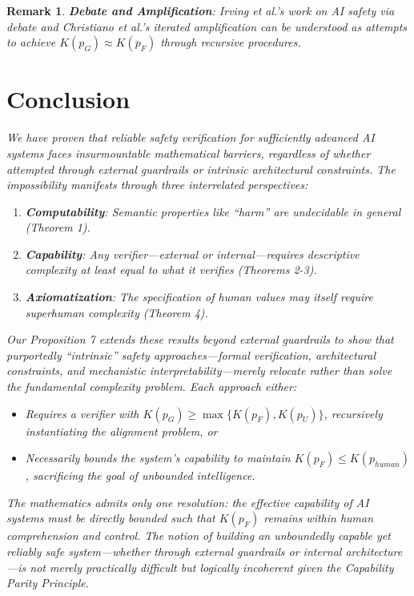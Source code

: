 \documentclass[11pt]{article}
\newtheorem{remark}{Remark}
\begin{document}
\begin{remark}
\textbf{Debate and Amplification}: Irving et al.'s work on AI safety via debate \cite{irving2018debate} and Christiano et al.'s iterated amplification \cite{christiano2018amplification} can be understood as attempts to achieve $K(p_G) \approx K(p_F)$ through recursive procedures.

\section{Conclusion}

We have proven that reliable safety verification for sufficiently advanced AI systems faces insurmountable mathematical barriers, regardless of whether attempted through external guardrails or intrinsic architectural constraints. The impossibility manifests through three interrelated perspectives:

\begin{enumerate}
\item \textbf{Computability}: Semantic properties like ``harm'' are undecidable in general (Theorem 1).
\item \textbf{Capability}: Any verifier—external or internal—requires descriptive complexity at least equal to what it verifies (Theorems 2-3).
\item \textbf{Axiomatization}: The specification of human values may itself require superhuman complexity (Theorem 4).
\end{enumerate}

Our Proposition 7 extends these results beyond external guardrails to show that purportedly ``intrinsic'' safety approaches—formal verification, architectural constraints, and mechanistic interpretability—merely relocate rather than solve the fundamental complexity problem. Each approach either:
\begin{itemize}
\item Requires a verifier with $K(p_G) \geq \max\{K(p_F), K(p_U)\}$, recursively instantiating the alignment problem, or
\item Necessarily bounds the system's capability to maintain $K(p_F) \leq K(p_{human})$, sacrificing the goal of unbounded intelligence.
\end{itemize}

The mathematics admits only one resolution: the effective capability of AI systems must be directly bounded such that $K(p_F)$ remains within human comprehension and control. The notion of building an unboundedly capable yet reliably safe system—whether through external guardrails or internal architecture—is not merely practically difficult but logically incoherent given the Capability Parity Principle.


\end{remark}
\end{document}
